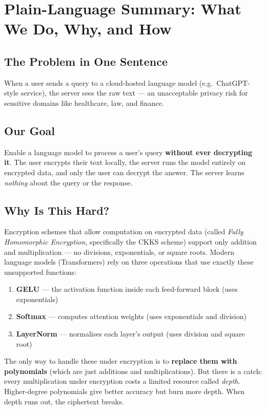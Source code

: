 \documentclass[12pt, a4paper]{article}
\begin{document}
\section{Plain-Language Summary: What We Do, Why, and How}

\subsection*{The Problem in One Sentence}
When a user sends a query to a cloud-hosted language model (e.g.\ ChatGPT-style service), the server sees the raw text — an unacceptable privacy risk for sensitive domains like healthcare, law, and finance.

\subsection*{Our Goal}
Enable a language model to process a user's query \textbf{without ever decrypting it}. The user encrypts their text locally, the server runs the model entirely on encrypted data, and only the user can decrypt the answer. The server learns \emph{nothing} about the query or the response.

\subsection*{Why Is This Hard?}
Encryption schemes that allow computation on encrypted data (called \emph{Fully Homomorphic Encryption}, specifically the CKKS scheme) support only addition and multiplication — no divisions, exponentials, or square roots. Modern language models (Transformers) rely on three operations that use exactly these unsupported functions:

\begin{enumerate}[leftmargin=2em]
  \item \textbf{GELU} — the activation function inside each feed-forward block (uses exponentials)
  \item \textbf{Softmax} — computes attention weights (uses exponentials and division)
  \item \textbf{LayerNorm} — normalises each layer's output (uses division and square root)
\end{enumerate}

The only way to handle these under encryption is to \textbf{replace them with polynomials} (which are just additions and multiplications). But there is a catch: every multiplication under encryption costs a limited resource called \emph{depth}. Higher-degree polynomials give better accuracy but burn more depth. When depth runs out, the ciphertext breaks.
\end{document}
